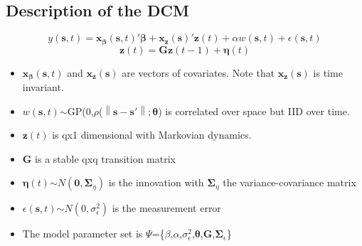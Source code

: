 \subsection{Description of the DCM}

\begin{displaymath}{y(\pmb{s},t)=\pmb{x_\beta}(\pmb{s},t)'\pmb{\beta}+\pmb{x_z}(\pmb{s})'\pmb{z}(t)+\alpha w(\pmb{s},t)+\epsilon(\pmb{s},t)}\end{displaymath}
\begin{displaymath}{\pmb{z}(t)=\pmb{Gz}(t-1)+\pmb{\eta}(t)}\end{displaymath}
\begin{itemize}
	\item \begin{math}{\pmb{x_\beta}(\pmb{s},t)}\end{math} and \begin{math}{ \pmb{x_z}(\pmb{s})}\end{math} are vectors of covariates. Note that \begin{math}{ \pmb{x_z}(\pmb{s})}\end{math} is time invariant.
	\item \begin{math}{w(\pmb{s},t)}\end{math}$\sim$GP(0,$\rho$(\begin{math}{ \left \| \pmb{s}-\pmb{s'} \right \|;\pmb{\theta}}\end{math}) is correlated over space but IID over time.
	\item \begin{math}{\pmb{z}(t)}\end{math} is qx1 dimensional with Markovian dynamics.
	\item \textbf{G} is a stable qxq transition matrix
	\item \begin{math}{\pmb{\eta}(t)}\end{math}$\sim$\begin{math}{\mathit{N}(\pmb{0},\pmb{\Sigma}_\eta)}\end{math} is the innovation with \begin{math}{\pmb{\Sigma}_\eta}\end{math} the variance-covariance matrix
	\item \begin{math}{\epsilon(\pmb{s},t)}\end{math}$\sim$\begin{math}{
			\mathit{N}(0,\sigma_\epsilon^2)}	\end{math} is the measurement error
	\item The model parameter set is $\Psi$=\{\textbf{$\beta$},$\alpha$,$\sigma_\epsilon^2$,$\pmb{\theta}$,$\pmb{G}$,$\pmb{\Sigma}_\epsilon$\}
\end{itemize}
